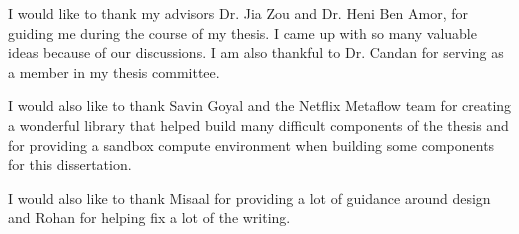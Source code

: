 I would like to thank my advisors Dr. Jia Zou and Dr. Heni Ben Amor, for guiding me during the course of my thesis. I came up with so many valuable ideas because of our discussions. I am also thankful to Dr. Candan for serving as a member in my thesis committee. 

I would also like to thank Savin Goyal and the Netflix Metaflow team for creating a wonderful library that helped build many difficult components of the thesis and for providing a sandbox compute environment when building some components for this dissertation. 

I would also like to thank Misaal for providing a lot of guidance around design and Rohan for helping fix a lot of the writing. 